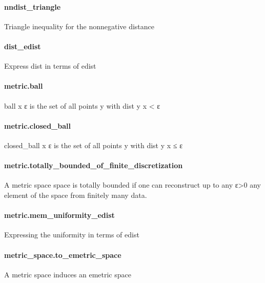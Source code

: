 \documentclass{article}
\begin{document}
\paragraph{nndist\_triangle}
\par
Triangle inequality for the nonnegative distance
\paragraph{dist\_edist}
\par
Express 
\colorbox[RGB]{253,246,227}{{{{\color[RGB]{101, 123, 131} dist }}}} in terms of 
\colorbox[RGB]{253,246,227}{{{{\color[RGB]{101, 123, 131} edist }}}}\paragraph{metric.ball}
\par
\colorbox[RGB]{253,246,227}{{{{\color[RGB]{101, 123, 131} ball x ε }}}} is the set of all points 
\colorbox[RGB]{253,246,227}{{{{\color[RGB]{101, 123, 131} y }}}} with 
\colorbox[RGB]{253,246,227}{{{{\color[RGB]{101, 123, 131} dist y x  }}}{{{\color[RGB]{181, 137, 0} < }}}{{{\color[RGB]{101, 123, 131}  ε }}}}\paragraph{metric.closed\_ball}
\par
\colorbox[RGB]{253,246,227}{{{{\color[RGB]{101, 123, 131} closed\_ball x ε }}}} is the set of all points 
\colorbox[RGB]{253,246,227}{{{{\color[RGB]{101, 123, 131} y }}}} with 
\colorbox[RGB]{253,246,227}{{{{\color[RGB]{101, 123, 131} dist y x  }}}{{{\color[RGB]{181, 137, 0} ≤ }}}{{{\color[RGB]{101, 123, 131}  ε }}}}\paragraph{metric.totally\_bounded\_of\_finite\_discretization}
\par
A metric space space is totally bounded if one can reconstruct up to any ε>0 any element of the
space from finitely many data.
\paragraph{metric.mem\_uniformity\_edist}
\par
Expressing the uniformity in terms of 
\colorbox[RGB]{253,246,227}{{{{\color[RGB]{101, 123, 131} edist }}}}\paragraph{metric\_space.to\_emetric\_space}
\par
A metric space induces an emetric space
\end{document}
